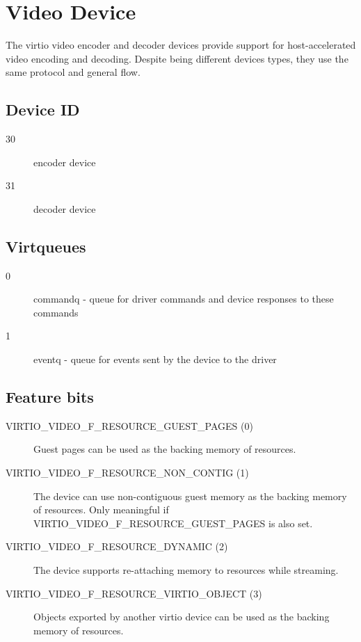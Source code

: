 \section{Video Device}\label{sec:Device Types / Video Device}

The virtio video encoder and decoder devices provide support for
host-accelerated video encoding and decoding. Despite being different
devices types, they use the same protocol and general flow.

\subsection{Device ID}\label{sec:Device Types / Video Device / Device ID}

\begin{description}
\item[30]
encoder device
\item[31]
decoder device
\end{description}

\subsection{Virtqueues}\label{sec:Device Types / Video Device / Virtqueues}

\begin{description}
\item[0]
commandq - queue for driver commands and device responses to these
commands
\item[1]
eventq - queue for events sent by the device to the driver
\end{description}

\subsection{Feature bits}\label{sec:Device Types / Video Device / Feature bits}

\begin{description}
\item[VIRTIO\_VIDEO\_F\_RESOURCE\_GUEST\_PAGES (0)]
Guest pages can be used as the backing memory of resources.
\item[VIRTIO\_VIDEO\_F\_RESOURCE\_NON\_CONTIG (1)]
The device can use non-contiguous guest memory as the backing memory of
resources. Only meaningful if VIRTIO\_VIDEO\_F\_RESOURCE\_GUEST\_PAGES
is also set.
\item[VIRTIO\_VIDEO\_F\_RESOURCE\_DYNAMIC (2)]
The device supports re-attaching memory to resources while streaming.
\item[VIRTIO\_VIDEO\_F\_RESOURCE\_VIRTIO\_OBJECT (3)]
Objects exported by another virtio device can be used as the backing
memory of resources.
\end{description}

